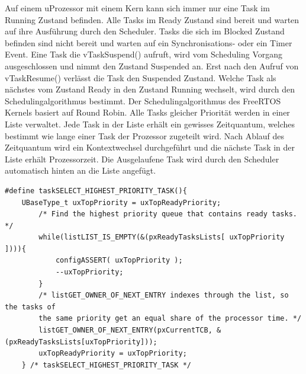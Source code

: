 Auf einem uProzessor mit einem Kern kann sich immer nur eine Task im Running Zustand befinden. Alle Tasks im Ready Zustand sind bereit und warten auf ihre Ausführung durch den Scheduler. Tasks die sich im Blocked Zustand befinden sind nicht bereit und warten auf ein Synchronisations- oder ein Timer Event. Eine Task die vTaskSuspend() aufruft, wird vom Scheduling Vorgang ausgeschlossen und nimmt den Zustand Suspended an. Erst nach den Aufruf von vTaskResume() verlässt die Task den Suspended Zustand.  Welche Task als nächstes vom Zustand Ready in den Zustand Running wechselt, wird durch den Schedulingalgorithmus bestimmt. Der Schedulingalgorithmus des FreeRTOS Kernels basiert auf Round Robin\cite{9783827373427}. Alle Tasks gleicher Priorität werden in einer Liste verwaltet. Jede Task in der Liste erhält ein gewisses Zeitquantum, welches bestimmt wie lange einer Task der Prozessor zugeteilt wird. Nach Ablauf des Zeitquantum wird ein Kontextwechsel durchgeführt und die nächste Task in der Liste erhält Prozessorzeit. Die Ausgelaufene Task wird durch den Scheduler automatisch hinten an die Liste angefügt. 
\begin{lstlisting}[caption={Pre-emptive List selection aus Task.c}, linewidth=8cm,captionpos=b, label=lst:nextTask, float=hbt]
#define taskSELECT_HIGHEST_PRIORITY_TASK(){																									
	UBaseType_t uxTopPriority = uxTopReadyPriority;														
		/* Find the highest priority queue that contains ready tasks. */								
		while(listLIST_IS_EMPTY(&(pxReadyTasksLists[ uxTopPriority ]))){																								
			configASSERT( uxTopPriority );																
			--uxTopPriority;																			
		}																								
		/* listGET_OWNER_OF_NEXT_ENTRY indexes through the list, so the tasks of						
		the	same priority get an equal share of the processor time. */									
		listGET_OWNER_OF_NEXT_ENTRY(pxCurrentTCB, &(pxReadyTasksLists[uxTopPriority]));			
		uxTopReadyPriority = uxTopPriority;																
	} /* taskSELECT_HIGHEST_PRIORITY_TASK */
\end{lstlisting}

